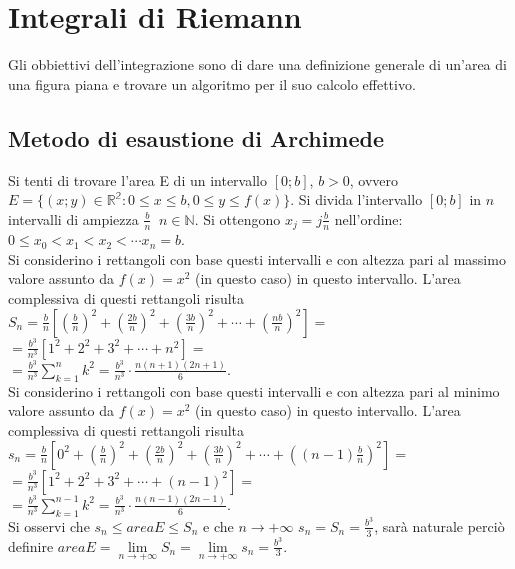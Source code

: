 \chapter{Integrali di Riemann}
Gli obbiettivi dell'integrazione sono di dare una definizione generale di un'area di una figura piana e trovare un algoritmo per il suo calcolo effettivo.
\section{Metodo di esaustione di Archimede}
Si tenti di trovare l'area E di un intervallo $[0;b]$, $b>0$, ovvero $E=\{(x;y)\in\mathbb{R^2}:0\le x\le b, 0\le y\le f(x)\}$. Si divida l'intervallo $[0;b]$ in $n$ intervalli di 
ampiezza $\frac{b}{n}\;\; n\in\mathbb{N}$. Si ottengono $x_j=j\frac{b}{n}$ nell'ordine: $0\le x_0<x_1<x_2<\cdots x_n=b$.\\
Si considerino i rettangoli con base questi intervalli e con altezza pari al massimo valore assunto da $f(x)=x^2$ (in questo caso) in questo intervallo. L'area complessiva di 
questi rettangoli risulta\\
$S_n=\frac{b}{n}[(\frac{b}{n})^2+(\frac{2b}{n})^2+(\frac{3b}{n})^2+\cdots+(\frac{nb}{n})^2]=$\\
$=\frac{b^3}{n^3}[1^2+2^2+3^2+\cdots+n^2]=$\\
$=\frac{b^3}{n^3}\sum\limits_{k=1}^nk^2=\frac{b^3}{n^3}\cdot\frac{n(n+1)(2n+1)}{6}$.\\
Si considerino i rettangoli con base questi intervalli e con altezza pari al minimo valore assunto da $f(x)=x^2$ (in questo caso) in questo intervallo. L'area complessiva di 
questi rettangoli risulta\\
$s_n=\frac{b}{n}[0^2+(\frac{b}{n})^2+(\frac{2b}{n})^2+(\frac{3b}{n})^2+\cdots+((n-1)\frac{b}{n})^2]=$\\
$=\frac{b^3}{n^3}[1^2+2^2+3^2+\cdots+(n-1)^2]=$\\
$=\frac{b^3}{n^3}\sum\limits_{k=1}^{n-1}k^2=\frac{b^3}{n^3}\cdot\frac{n(n-1)(2n-1)}{6}$.\\
Si osservi che $s_n\le areaE\le S_n$ e che $n\rightarrow+\infty$ $s_n=S_n=\frac{b^3}{3}$, sar\`a naturale perci\`o definire $areaE=\lim\limits_{n\rightarrow+\infty}S_n=\lim
\limits_{n\rightarrow+\infty}s_n=\frac{b^3}{3}$.
